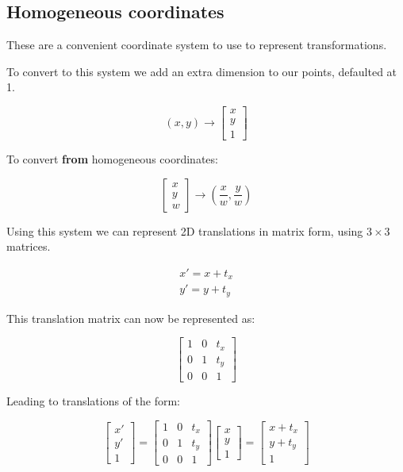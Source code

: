 \documentclass{article}
\begin{document}
\subsection{Homogeneous coordinates}

These are a convenient coordinate system to use to represent transformations.

To convert to this system we add an extra dimension to our points, defaulted at 1.

\[
  (x,y) \to \begin{bmatrix}
    x \\ y \\ 1
  \end{bmatrix}
\]

To convert \textbf{from} homogeneous coordinates:

\[
  \begin{bmatrix}
    x \\ y \\ w
  \end{bmatrix} \to \left(\frac{x}{w}, \frac{y}{w} \right)
\]


Using this system we can represent 2D translations in matrix form, using $3\times 3$ matrices.

\begin{align*}
  x' = x + t_{x} \\
  y' = y + t_{y}
\end{align*}

This translation matrix can now be represented as:

\[
  \begin{bmatrix}
    1 & 0 & t_{x} \\
    0 & 1 & t_{y} \\
    0 & 0 & 1
  \end{bmatrix}
\]

Leading to translations of the form:

\[
  \begin{bmatrix}
    x' \\ y' \\ 1
  \end{bmatrix} =
  \begin{bmatrix}
    1 & 0 & t_{x} \\
    0 & 1 & t_{y} \\
    0 & 0 & 1
  \end{bmatrix}
  \begin{bmatrix}
    x \\ y \\ 1
  \end{bmatrix} =
  \begin{bmatrix}
    x + t_x \\
    y + t_y \\
    1
  \end{bmatrix}
\]
\end{document}
